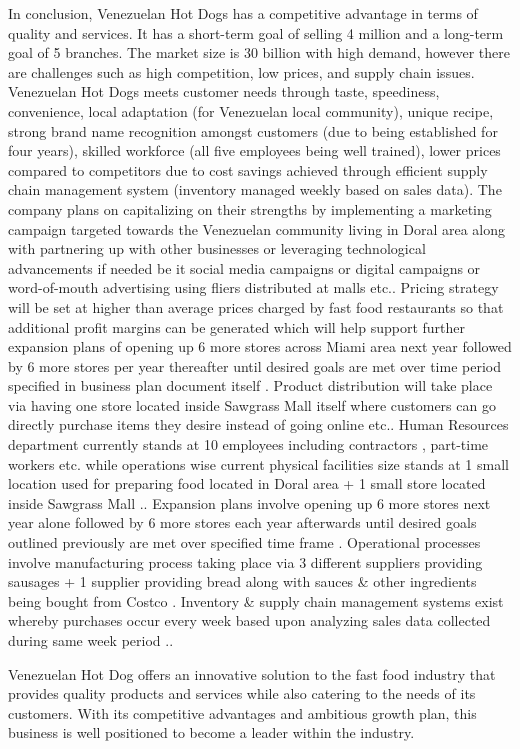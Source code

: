 
In conclusion, Venezuelan Hot Dogs has a competitive advantage in terms of quality and services. It has a short-term goal of selling 4 million and a long-term goal of 5 branches. The market size is 30 billion with high demand, however there are challenges such as high competition, low prices, and supply chain issues. Venezuelan Hot Dogs meets customer needs through taste, speediness, convenience, local adaptation (for Venezuelan local community), unique recipe, strong brand name recognition amongst customers (due to being established for four years), skilled workforce (all five employees being well trained), lower prices compared to competitors due to cost savings achieved through efficient supply chain management system (inventory managed weekly based on sales data). The company plans on capitalizing on their strengths by implementing a marketing campaign targeted towards the Venezuelan community living in Doral area along with partnering up with other businesses or leveraging technological advancements if needed be it social media campaigns or digital campaigns or word-of-mouth advertising using fliers distributed at malls etc.. Pricing strategy will be set at higher than average prices charged by fast food restaurants so that additional profit margins can be generated which will help support further expansion plans of opening up 6 more stores across Miami area next year followed by 6 more stores per year thereafter until desired goals are met over time period specified in business plan document itself . Product distribution will take place via having one store located inside Sawgrass Mall itself where customers can go directly purchase items they desire instead of going online etc.. Human Resources department currently stands at 10 employees including contractors , part-time workers etc. while operations wise current physical facilities size stands at 1 small location used for preparing food located in Doral area + 1 small store located inside Sawgrass Mall .. Expansion plans involve opening up 6 more stores next year alone followed by 6 more stores each year afterwards until desired goals outlined previously are met over specified time frame . Operational processes involve manufacturing process taking place via 3 different suppliers providing sausages + 1 supplier providing bread along with sauces & other ingredients being bought from Costco . Inventory & supply chain management systems exist whereby purchases occur every week based upon analyzing sales data collected during same week period .. 


Venezuelan Hot Dog offers an innovative solution to the fast food industry that provides quality products and services while also catering to the needs of its customers. With its competitive advantages and ambitious growth plan, this business is well positioned to become a leader within the industry.